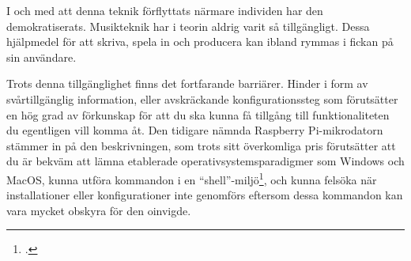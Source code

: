 \documentclass{article}
\begin{document}
I och med att denna teknik förflyttats närmare individen har den demokratiserats. Musikteknik har i teorin
aldrig varit så tillgängligt. Dessa hjälpmedel för att skriva, spela in och producera kan ibland rymmas i
fickan på sin användare.

Trots denna tillgänglighet finns det fortfarande barriärer. Hinder i form av svårtillgänglig information,
eller avskräckande konfigurationssteg som förutsätter en hög grad av förkunskap för att du ska kunna få
tillgång till funktionaliteten du egentligen vill komma åt. Den tidigare nämnda Raspberry Pi-mikrodatorn
stämmer in på den beskrivningen, som trots sitt överkomliga pris förutsätter att du är bekväm att lämna
etablerade operativsystemsparadigmer som Windows och MacOS, kunna utföra kommandon i en
``shell''-miljö\footcite{unix}, och kunna felsöka när
installationer eller konfigurationer inte genomförs
eftersom dessa kommandon kan vara mycket obskyra för den oinvigde.
	
\end{document}
